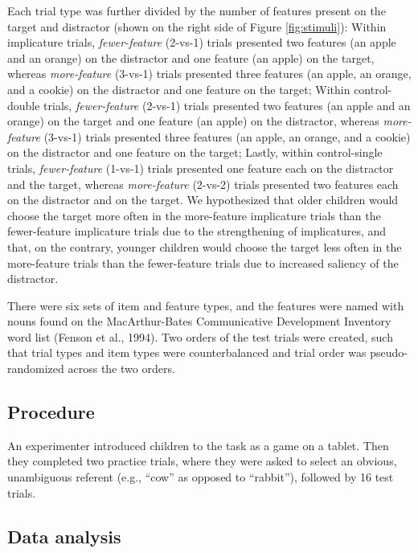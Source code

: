 \documentclass[man]{apa6}
\theoremstyle{definition}
\theoremstyle{definition}
\theoremstyle{definition}
\theoremstyle{remark}
\begin{document}
Each trial type was further divided by the number of features present on
the target and distractor (shown on the right side of Figure
\ref{fig:stimuli}): Within implicature trials, \emph{fewer-feature}
(2-vs-1) trials presented two features (an apple and an orange) on the
distractor and one feature (an apple) on the target, whereas
\emph{more-feature} (3-vs-1) trials presented three features (an apple,
an orange, and a cookie) on the distractor and one feature on the
target; Within control-double trials, \emph{fewer-feature} (2-vs-1)
trials presented two features (an apple and an orange) on the target and
one feature (an apple) on the distractor, whereas \emph{more-feature}
(3-vs-1) trials presented three features (an apple, an orange, and a
cookie) on the distractor and one feature on the target; Lastly, within
control-single trials, \emph{fewer-feature} (1-vs-1) trials presented
one feature each on the distractor and the target, whereas
\emph{more-feature} (2-vs-2) trials presented two features each on the
distractor and on the target. We hypothesized that older children would
choose the target more often in the more-feature implicature trials than
the fewer-feature implicature trials due to the strengthening of
implicatures, and that, on the contrary, younger children would choose
the target less often in the more-feature trials than the fewer-feature
trials due to increased saliency of the distractor.

There were six sets of item and feature types, and the features were
named with nouns found on the MacArthur-Bates Communicative Development
Inventory word list (Fenson et al., 1994). Two orders of the test trials
were created, such that trial types and item types were counterbalanced
and trial order was pseudo-randomized across the two orders.

\subsection{Procedure}\label{procedure}

An experimenter introduced children to the task as a game on a tablet.
Then they completed two practice trials, where they were asked to select
an obvious, unambiguous referent (e.g., \enquote{cow} as opposed to
\enquote{rabbit}), followed by 16 test trials.

\subsection{Data analysis}\label{data-analysis}
\end{document}
